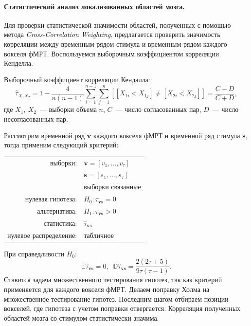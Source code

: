 \paragraph*{Статистический анализ локализованных областей мозга.}
\label{par:stat_anal} %
Для проверки статистической значимости областей, полученных с помощью метода \textit{Cross-Correlation Weighting}, предлагается проверить значимость корреляции между временным рядом стимула и временным рядом каждого вокселя фМРТ. Воспользуемся выборочным коэффициентом корреляции Кенделла. 
\begin{definition}
Выборочный коэффициент корреляции Кендалла:
$$\hat{\tau}_{X_1X_2} = 1 - \frac{4}{n\left(n-1\right)} \sum_{i=1}^{n-1} \sum_{j=1}^n \left[\left[X_{1i}<X_{1j}\right]\neq\left[X_{2i}<X_{2j}\right]\right] = \frac{C-D}{C+D},$$
где $X_1,~X_2$~--- выборки объема $n$, $C$~--- число согласованных пар, $D$~--- число несогласованных пар.
\end{definition}
Рассмотрим временной ряд $\bm{v}$ каждого вокселя фМРТ и временной ряд стимула $\bm{s}$, тогда применим следующий критерий:
\begin{center}
			\begin{tabular}{rl}
				выборки:                        & $\bm{v}=\left[v_{1},\ldots,v_{\tau}\right]$\\
				                                & $\bm{s}=\left[s_{1},\ldots,s_{\tau}\right]$\\
				                                & выборки связанные\\
				нулевая гипотеза:               & $H_0\colon \tau_{\bm{v}\bm{s}}=0$ \\
				альтернатива:                   & $H_1\colon \tau_{\bm{v}\bm{s}}>0$ \\
				статистика:                     & $\hat{\tau}_{\bm{v}\bm{s}}$ \\
				нулевое распределение:          & табличное\\
			\end{tabular}
		\end{center}
При справедливости $H_0$:
$$\mathbb{E}\hat{\tau}_{\bm{v}\bm{s}} = 0, \;\; \mathbb{D}\hat{\tau}_{\bm{v}\bm{s}} = \frac{2\left(2\tau+5\right)}{9\tau\left(\tau-1\right)}.$$
Ставится задача множественного тестирования гипотез, так как критерий применяется для каждого вокселя фМРТ. Делаем поправку Холма на множественное тестирование гипотез. Последним шагом отбираем позиции вокселей, где гипотеза с учетом поправки отвергается. Корреляция полученных областей мозга со стимулом статистически значима. 

